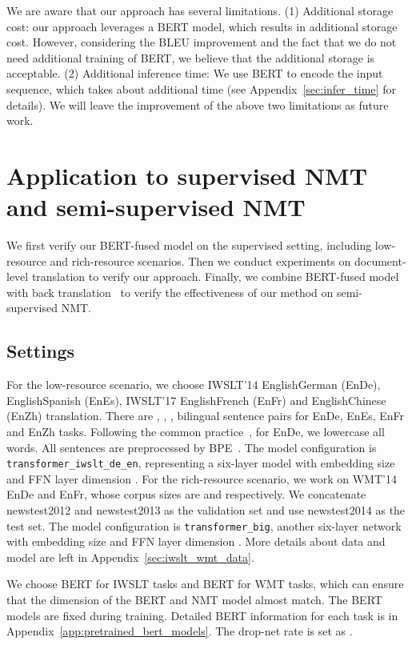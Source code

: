 \documentclass{article} \usepackage{iclr2020_conference,times}
\begin{document}
 We are aware that our approach has several limitations. (1) Additional storage cost: our approach leverages a BERT model, which results in additional storage cost. However, considering the BLEU improvement and the fact that we do not need additional training of BERT, we believe that the additional storage is acceptable. (2) Additional inference time: We use BERT to encode the input sequence, which takes about  additional time (see Appendix~\ref{sec:infer_time} for details). We will leave the improvement of the above two limitations as future work.

\section{Application to supervised NMT and semi-supervised NMT}\label{sec:supervised_nmt}
We first verify our BERT-fused model on the supervised setting, including low-resource and rich-resource scenarios. Then we conduct experiments on document-level translation to verify our approach. Finally, we combine BERT-fused model with back translation~\citep{sennrich2016improving} to verify the effectiveness of our method on semi-supervised NMT.

\subsection{Settings}\label{sec:sup_nmt:setting}
 For the low-resource scenario, we choose IWSLT'14 EnglishGerman (EnDe), EnglishSpanish (EnEs), IWSLT'17 EnglishFrench (EnFr) and EnglishChinese (EnZh) translation. There are , , ,  bilingual sentence pairs for EnDe, EnEs, EnFr and EnZh tasks. Following the common practice~\citep{edunov2018classical}, for EnDe, we lowercase all words. All sentences are preprocessed by BPE~\citep{sennrich2016neural}. The model configuration is \texttt{transformer\_iwslt\_de\_en}, representing a six-layer model with embedding size  and FFN layer dimension . For the rich-resource scenario, we work on WMT'14 EnDe and EnFr, whose corpus sizes are  and  respectively. We concatenate newstest2012 and newstest2013 as the validation set and use newstest2014 as the test set. The model configuration is \texttt{transformer\_big}, another six-layer network with embedding size  and FFN layer dimension .   More details about data and model  are left in Appendix~\ref{sec:iwslt_wmt_data}.

We choose BERT for IWSLT tasks and BERT for WMT tasks, which can ensure that the dimension of the BERT and NMT model almost match. The BERT models are fixed during training. Detailed BERT information for each task is in Appendix~\ref{app:pretrained_bert_models}. The drop-net rate  is set as .
\end{document}
